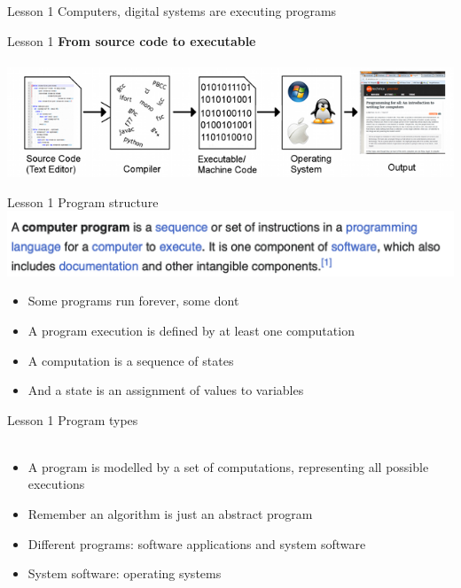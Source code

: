 \documentclass[aspectratio=1610]{beamer}
\begin{document}




\begin{frame}{Lesson 1}{}
\Huge Computers, digital systems are executing programs
\end{frame}


\begin{frame}{Lesson 1}{}
\Large
\textbf{From source code to executable}\\~\\ 
\includegraphics[scale=0.65]{Images/CompilationChain}
\end{frame}


\begin{frame}{Lesson 1}{}
{\Huge{Program structure}}
\includegraphics[scale=0.67]{Images/program}

\Large{
\begin{itemize}
    \item Some programs run forever, some dont
    \item A program execution is defined by at least one computation
    \item A computation is a sequence of states
    \item And a state is an assignment of values to variables
\end{itemize}}

\end{frame}


\begin{frame}{Lesson 1}{}
{\Huge{Program types}}\\~\\ 

\Large{
\begin{itemize}
    \item A program is modelled by a set of computations, representing all possible executions
    \item Remember an algorithm is just an abstract program
    \item Different programs: software applications and system software
    \item System software: operating systems
\end{itemize}}
\end{frame}
\end{document}
